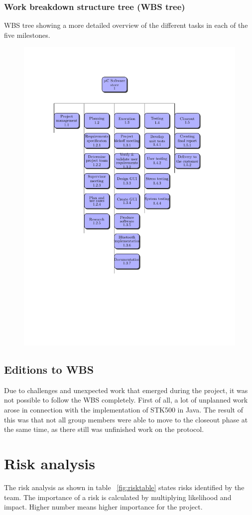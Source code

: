 \subsubsection{Work breakdown structure tree (WBS tree)}
WBS tree showing a more detailed overview of the different tasks in each of the five milestones.
\begin{figure}[H]
\vspace*{-1.5in}
\hspace*{-1.2in}
\includegraphics[trim=0cm 4cm 0cm 0cm]{figures/wbs-tree.pdf}
\end{figure}

\subsection{Editions to WBS}
Due to challenges and unexpected work that emerged during the project, it was not possible to follow the WBS completely. First of all, a lot of unplanned work arose in connection with the implementation of STK500 in Java. The result of this was that not all group members were able to move to the closeout phase at the same time, as there still was unfinished work on the protocol.

\section{Risk analysis}
The risk analysis as shown in table ~\ref{fig:risktable} states risks identified by the team. The importance of a risk is calculated by multiplying likelihood and impact. Higher number means higher importance for the project. 

